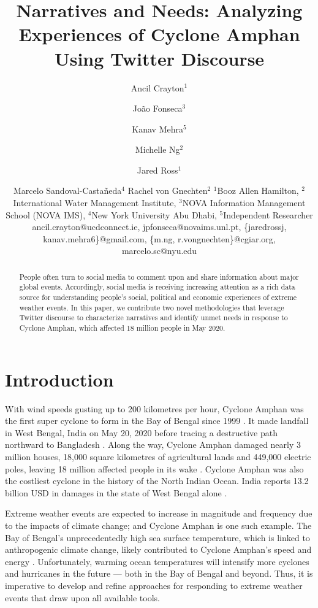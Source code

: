 \documentclass{article}
\title{Narratives and Needs: Analyzing Experiences of Cyclone Amphan Using Twitter Discourse}
\author{
Ancil Crayton$^1$
\and
João Fonseca$^3$\and
Kanav Mehra$^5$\and
Michelle Ng$^2$\and
Jared Ross$^1$\and
Marcelo Sandoval-Castañeda$^4$\And
Rachel von Gnechten$^2$
\affiliations
$^1$Booz Allen Hamilton, 
$^2$International Water Management Institute, 
$^3$NOVA Information Management School (NOVA IMS),
$^4$New York University Abu Dhabi,
$^5$Independent Researcher
\emails
ancil.crayton@ucdconnect.ie, jpfonseca@novaims.unl.pt,
\{jaredrossj, kanav.mehra6\}@gmail.com,
\{m.ng, r.vongnechten\}@cgiar.org,
marcelo.sc@nyu.edu
}
\begin{document}
\maketitle

\begin{abstract} 
    People often turn to social media to comment upon and share information about major
    global events. Accordingly, social media is receiving increasing attention as a rich data source
    for understanding people's social, political and economic experiences of extreme weather events.
    In this paper, we contribute two novel methodologies that leverage Twitter discourse to
    characterize narratives and identify unmet needs in response to Cyclone Amphan, which affected
    18 million people in May 2020.
\end{abstract}

\section{Introduction}

With wind speeds gusting up to 200 kilometres per hour, Cyclone Amphan was the first super cyclone
to form in the Bay of Bengal since 1999 \cite{introNasa}. It made landfall in West Bengal, India on
May 20, 2020 before tracing a destructive path northward to Bangladesh \cite{introForbes}. Along the
way, Cyclone Amphan damaged nearly 3 million houses, 18,000 square kilometres of agricultural lands
and 449,000 electric poles, leaving 18 million affected people in its wake
\cite{introRedcross,introState}. Cyclone Amphan was also the costliest cyclone in the history of the
North Indian Ocean. India reports 13.2 billion USD in damages in the state of West Bengal alone
\cite{introState}.

Extreme weather events are expected to increase in magnitude and frequency due to the impacts of
climate change; and Cyclone Amphan is one such example. The Bay of Bengal’s unprecedentedly high sea
surface temperature, which is linked to anthropogenic climate change, likely contributed to Cyclone
Amphan’s speed and energy \cite{introIwmi}. Unfortunately, warming ocean temperatures will intensify
more cyclones and hurricanes in the future — both in the Bay of Bengal and beyond. Thus, it is
imperative to develop and refine approaches for responding to extreme weather events that draw upon
all available tools.
\end{document}
